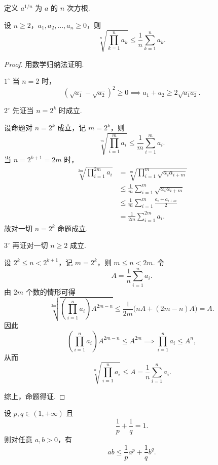 定义 $a^{1/n}$ 为 $a$ 的 $n$ 次方根. 

\begin{theorem}[均值不等式]
设 $n \ge 2$，$a_1,a_2,\dots,a_n \ge 0$，则
\[
\sqrt[n]{\prod_{k=1}^n a_k}\le \frac{1}{n}\sum_{k=1}^n a_k.
\]
\end{theorem}

\begin{proof}
用数学归纳法证明. 

$1^\circ$ 当 $n=2$ 时，
\[
(\sqrt{a_1}-\sqrt{a_2})^2 \ge 0
\implies a_1+a_2 \ge 2\sqrt{a_1a_2}.
\]

$2^\circ$ 先证当 $n=2^k$ 时成立. 

设命题对 $n=2^k$ 成立，记 $m=2^k$，则
\[
\sqrt[m]{\prod_{i=1}^m a_i}\le \frac{1}{m}\sum_{i=1}^m a_i.
\]
当 $n=2^{k+1}=2m$ 时，
\[
\begin{aligned}
\sqrt[2m]{\prod_{i=1}^{2m} a_i}
&=\sqrt[m]{\prod_{i=1}^m \sqrt{a_i a_{i+m}}} \\
&\le \frac{1}{m}\sum_{i=1}^m \sqrt{a_i a_{i+m}} \\
&\le \frac{1}{m}\sum_{i=1}^m \frac{a_i+a_{i+m}}{2} \\
&=\frac{1}{2m}\sum_{i=1}^{2m} a_i.
\end{aligned}
\]
故对一切 $n=2^k$ 命题成立. 

$3^\circ$ 再证对一切 $n \ge 2$ 成立. 

设 $2^k \le n < 2^{k+1}$，记 $m=2^k$，则 $m \le n < 2m$. 令
\[
A=\frac{1}{n}\sum_{i=1}^n a_i.
\]
由 $2m$ 个数的情形可得
\[
\sqrt[2m]{\left(\prod_{i=1}^n a_i\right)A^{2m-n}}
\le \frac{1}{2m}\bigl(nA+(2m-n)A\bigr)=A.
\]
因此
\[
\left(\prod_{i=1}^n a_i\right)A^{2m-n}\le A^{2m}
\implies \prod_{i=1}^n a_i \le A^n,
\]
从而
\[
\sqrt[n]{\prod_{i=1}^n a_i}\le A=\frac{1}{n}\sum_{i=1}^n a_i.
\]

综上，命题得证. 
\end{proof}

\begin{theorem}
设 $p,q \in (1,+\infty)$ 且
\[
\frac{1}{p}+\frac{1}{q}=1.
\]
则对任意 $a,b>0$，有
\[
ab\le \frac{1}{p}a^p+\frac{1}{q}b^q.
\]
\end{theorem}

